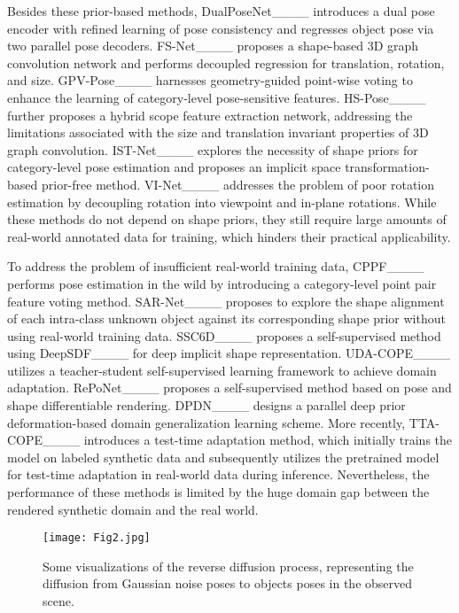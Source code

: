 \par Besides these prior-based methods, DualPoseNet____ introduces a dual pose encoder with refined learning of pose consistency and regresses object pose via two parallel pose decoders. FS-Net____ proposes a shape-based 3D graph convolution network and performs decoupled regression for translation, rotation, and size. GPV-Pose____ harnesses geometry-guided point-wise voting to enhance the learning of category-level pose-sensitive features. HS-Pose____ further proposes a hybrid scope feature extraction network, addressing the limitations associated with the size and translation invariant properties of 3D graph convolution. IST-Net____ explores the necessity of shape priors for category-level pose estimation and proposes an implicit space transformation-based prior-free method. VI-Net____ addresses the problem of poor rotation estimation by decoupling rotation into viewpoint and in-plane rotations. While these methods do not depend on shape priors, they still require large amounts of real-world annotated data for training, which hinders their practical applicability.

\par To address the problem of insufficient real-world training data, CPPF____ performs pose estimation in the wild by introducing a category-level point pair feature voting method. SAR-Net____ proposes to explore the shape alignment of each intra-class unknown object against its corresponding shape prior without using real-world training data. SSC6D____ proposes a self-supervised method using DeepSDF____ for deep implicit shape representation. UDA-COPE____ utilizes a teacher-student self-supervised learning framework to achieve domain adaptation. RePoNet____ proposes a self-supervised method based on pose and shape differentiable rendering. DPDN____ designs a parallel deep prior deformation-based domain generalization learning scheme. More recently, TTA-COPE____ introduces a test-time adaptation method, which initially trains the model on labeled synthetic data and subsequently utilizes the pretrained model for test-time adaptation in real-world data during inference. Nevertheless, the performance of these methods is limited by the huge domain gap between the rendered synthetic domain and the real world.

\begin{figure*}[htbp]
\centering
\texttt{[image: Fig2.jpg]}
\vspace{-2em}
\caption{Some visualizations of the reverse diffusion process, representing the diffusion from Gaussian noise poses to objects poses in the observed scene.}
\label{Fig2}
\vspace{-1em}
\end{figure*}

